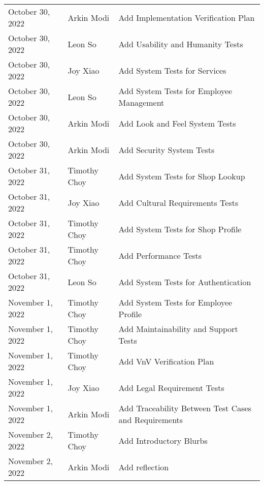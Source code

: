 \documentclass[12pt, titlepage]{article}
\begin{document}
\begin{longtable}{p{} p{} p{}}
	October 30, 2022 & Arkin Modi            & Add Implementation Verification Plan                        \\
	October 30, 2022 & Leon So               & Add Usability and Humanity Tests                            \\
	October 30, 2022 & Joy Xiao              & Add System Tests for Services                               \\
	October 30, 2022 & Leon So               & Add System Tests for Employee Management                    \\
	October 30, 2022 & Arkin Modi            & Add Look and Feel System Tests                              \\
	October 30, 2022 & Arkin Modi            & Add Security System Tests                                   \\
	October 31, 2022 & Timothy Choy          & Add System Tests for Shop Lookup                            \\
	October 31, 2022 & Joy Xiao              & Add Cultural Requirements Tests                             \\
	October 31, 2022 & Timothy Choy          & Add System Tests for Shop Profile                           \\
	October 31, 2022 & Timothy Choy          & Add Performance Tests                                       \\
	October 31, 2022 & Leon So               & Add System Tests for Authentication                         \\
	November 1, 2022 & Timothy Choy          & Add System Tests for Employee Profile                       \\
	November 1, 2022 & Timothy Choy          & Add Maintainability and Support Tests                       \\
	November 1, 2022 & Timothy Choy          & Add VnV Verification Plan                                   \\
	November 1, 2022 & Joy Xiao              & Add Legal Requirement Tests                                 \\
	November 1, 2022 & Arkin Modi            & Add Traceability Between Test Cases and Requirements        \\
	November 2, 2022 & Timothy Choy          & Add Introductory Blurbs                                     \\
	November 2, 2022 & Arkin Modi            & Add reflection                                              \\

\end{longtable}
\end{document}
